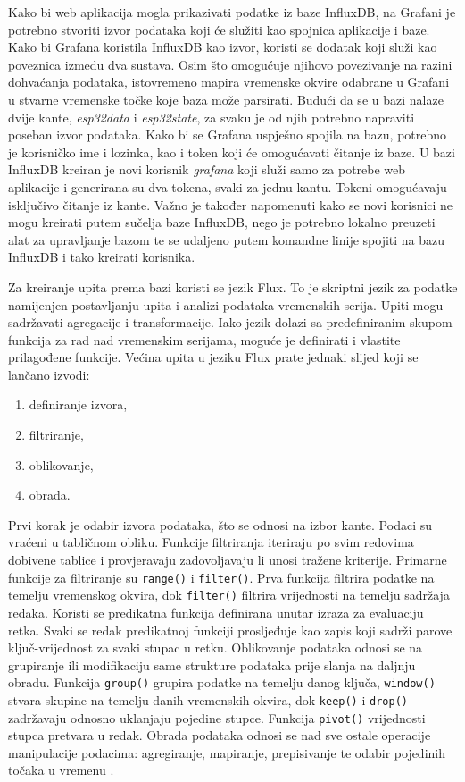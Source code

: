 Kako bi web aplikacija mogla prikazivati podatke iz baze InfluxDB, na Grafani je potrebno stvoriti izvor podataka koji će služiti kao spojnica aplikacije i baze. Kako bi Grafana koristila InfluxDB kao izvor, koristi se dodatak  koji služi kao poveznica između dva sustava. Osim što omogućuje njihovo povezivanje na razini dohvaćanja podataka, istovremeno mapira vremenske okvire odabrane u Grafani u stvarne vremenske točke koje baza može parsirati. Budući da se u bazi nalaze dvije kante, \textit{esp32data} i \textit{esp32state}, za svaku je od njih potrebno napraviti poseban izvor podataka. Kako bi se Grafana uspješno spojila na bazu, potrebno je korisničko ime i lozinka, kao i token koji će omogućavati čitanje iz baze. U bazi InfluxDB kreiran je novi korisnik \textit{grafana} koji služi samo za potrebe web aplikacije i generirana su dva tokena, svaki za jednu kantu. Tokeni omogućavaju isključivo čitanje iz kante. Važno je također napomenuti kako se novi korisnici ne mogu kreirati putem sučelja baze InfluxDB, nego je potrebno lokalno preuzeti alat za upravljanje bazom te se udaljeno putem komandne linije spojiti na bazu InfluxDB i tako kreirati korisnika.

Za kreiranje upita prema bazi koristi se jezik Flux. To je skriptni jezik za podatke  namijenjen postavljanju upita i analizi podataka vremenskih serija. Upiti mogu sadržavati agregacije i transformacije. Iako jezik dolazi sa predefiniranim skupom funkcija za rad nad vremenskim serijama, moguće je definirati i vlastite prilagođene funkcije. Većina upita u jeziku Flux prate jednaki slijed koji se lančano izvodi:
\begin{enumerate}
	\item definiranje izvora,
	\item filtriranje,
	\item oblikovanje,
	\item obrada. 
\end{enumerate}

Prvi korak je odabir izvora podataka, što se odnosi na izbor kante. Podaci su vraćeni u tabličnom obliku. Funkcije filtriranja iteriraju po svim redovima dobivene tablice i provjeravaju zadovoljavaju li unosi tražene kriterije. Primarne funkcije za filtriranje su \lstinline|range()| i \lstinline|filter()|. Prva funkcija filtrira podatke na temelju vremenskog okvira, dok \lstinline|filter()| filtrira vrijednosti na temelju sadržaja redaka. Koristi se predikatna funkcija definirana unutar izraza za evaluaciju retka. Svaki se redak predikatnoj funkciji prosljeđuje kao zapis koji sadrži parove ključ-vrijednost za svaki stupac u retku. Oblikovanje podataka odnosi se na grupiranje ili modifikaciju same strukture podataka prije slanja na daljnju obradu. Funkcija \lstinline|group()| grupira podatke na temelju danog ključa, \lstinline|window()| stvara skupine na temelju danih vremenskih okvira, dok \lstinline|keep()| i \lstinline|drop()| zadržavaju odnosno uklanjaju pojedine stupce. Funkcija \lstinline|pivot()| vrijednosti stupca pretvara u redak. Obrada podataka odnosi se nad sve ostale operacije manipulacije podacima: agregiranje, mapiranje, prepisivanje te odabir pojedinih točaka u vremenu \cite{influxdb}. 


